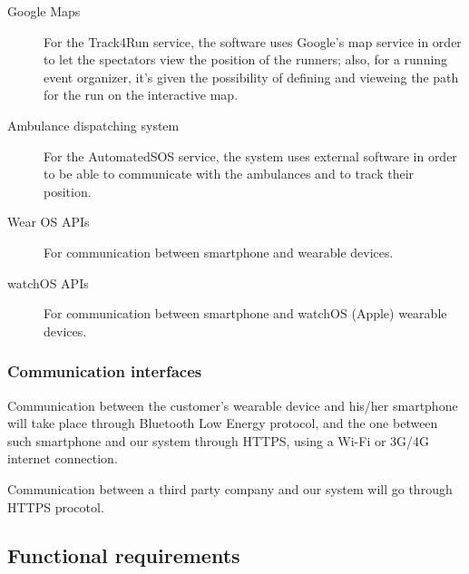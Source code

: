 \documentclass[../main.tex]{subfiles}
\begin{document}
\begin{description}

	\item [Google Maps] For the Track4Run service, the software uses Google's map service in order to let the spectators view the position of the runners; also, for a running event organizer, it's given the possibility of defining and vieweing the path for the run on the interactive map.

	\item [Ambulance dispatching system] For the AutomatedSOS service, the system uses external software in order to be able to communicate with the ambulances and to track their position.

	\item [Wear OS APIs] For communication between smartphone and wearable devices.
	\item [watchOS APIs] For communication between smartphone and watchOS (Apple) wearable devices.
\end{description}


\subsubsection{Communication interfaces}

Communication between the customer's wearable device and his/her smartphone will take place through Bluetooth Low Energy protocol, and the one between such smartphone and our system through HTTPS, using a Wi-Fi or 3G/4G internet connection.

Communication between a third party company and our system will go through HTTPS procotol.


\subsection{Functional requirements}
\end{document}
